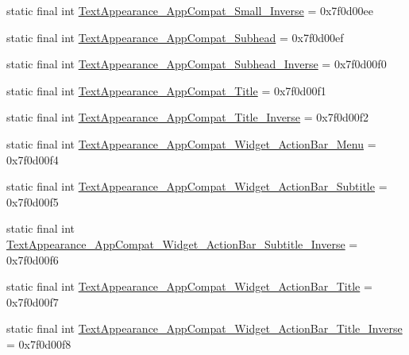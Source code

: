 \begin{DoxyCompactItemize}
\item 
static final int \mbox{\hyperlink{classcom_1_1google_1_1android_1_1gms_1_1R_1_1style_af18d461203ea8abfd6760a5b4d798ef4}{Text\+Appearance\+\_\+\+App\+Compat\+\_\+\+Small\+\_\+\+Inverse}} = 0x7f0d00ee
\item 
static final int \mbox{\hyperlink{classcom_1_1google_1_1android_1_1gms_1_1R_1_1style_a2fff39c84894dee14d793966d4fab649}{Text\+Appearance\+\_\+\+App\+Compat\+\_\+\+Subhead}} = 0x7f0d00ef
\item 
static final int \mbox{\hyperlink{classcom_1_1google_1_1android_1_1gms_1_1R_1_1style_a3e87ef8b33ac2be4ebc7e8f4aa332aea}{Text\+Appearance\+\_\+\+App\+Compat\+\_\+\+Subhead\+\_\+\+Inverse}} = 0x7f0d00f0
\item 
static final int \mbox{\hyperlink{classcom_1_1google_1_1android_1_1gms_1_1R_1_1style_a03035251bf1845ddef645e4723241d78}{Text\+Appearance\+\_\+\+App\+Compat\+\_\+\+Title}} = 0x7f0d00f1
\item 
static final int \mbox{\hyperlink{classcom_1_1google_1_1android_1_1gms_1_1R_1_1style_a86a4829de03cae185d9145a6ed91775a}{Text\+Appearance\+\_\+\+App\+Compat\+\_\+\+Title\+\_\+\+Inverse}} = 0x7f0d00f2
\item 
static final int \mbox{\hyperlink{classcom_1_1google_1_1android_1_1gms_1_1R_1_1style_a9420e2debb58f326a53e8fb6aa033c30}{Text\+Appearance\+\_\+\+App\+Compat\+\_\+\+Widget\+\_\+\+Action\+Bar\+\_\+\+Menu}} = 0x7f0d00f4
\item 
static final int \mbox{\hyperlink{classcom_1_1google_1_1android_1_1gms_1_1R_1_1style_aa2aa806c5c9568b598748f0a30c4472a}{Text\+Appearance\+\_\+\+App\+Compat\+\_\+\+Widget\+\_\+\+Action\+Bar\+\_\+\+Subtitle}} = 0x7f0d00f5
\item 
static final int \mbox{\hyperlink{classcom_1_1google_1_1android_1_1gms_1_1R_1_1style_a5cbbd3e0bcdfa186412ae0e6ec14dba7}{Text\+Appearance\+\_\+\+App\+Compat\+\_\+\+Widget\+\_\+\+Action\+Bar\+\_\+\+Subtitle\+\_\+\+Inverse}} = 0x7f0d00f6
\item 
static final int \mbox{\hyperlink{classcom_1_1google_1_1android_1_1gms_1_1R_1_1style_a1cfdd8461e215a602c7610a4602540f4}{Text\+Appearance\+\_\+\+App\+Compat\+\_\+\+Widget\+\_\+\+Action\+Bar\+\_\+\+Title}} = 0x7f0d00f7
\item 
static final int \mbox{\hyperlink{classcom_1_1google_1_1android_1_1gms_1_1R_1_1style_a8e1c5146b5a20db0d0c698b6f056ac71}{Text\+Appearance\+\_\+\+App\+Compat\+\_\+\+Widget\+\_\+\+Action\+Bar\+\_\+\+Title\+\_\+\+Inverse}} = 0x7f0d00f8
\item 

\end{DoxyCompactItemize}

